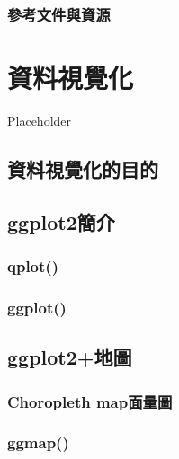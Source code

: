 \documentclass[]{book}
\begin{document}
\hypertarget{ux53c3ux8003ux6587ux4ef6ux8207ux8cc7ux6e90-1}{%
\subsection{參考文件與資源}\label{ux53c3ux8003ux6587ux4ef6ux8207ux8cc7ux6e90-1}}

\hypertarget{vis}{%
\chapter{資料視覺化}\label{vis}}

Placeholder

\hypertarget{ux8cc7ux6599ux8996ux89baux5316ux7684ux76eeux7684}{%
\section{資料視覺化的目的}\label{ux8cc7ux6599ux8996ux89baux5316ux7684ux76eeux7684}}

\hypertarget{ggplot2ux7c21ux4ecb}{%
\section{ggplot2簡介}\label{ggplot2ux7c21ux4ecb}}

\hypertarget{qplot}{%
\subsection{qplot()}\label{qplot}}

\hypertarget{ggplot}{%
\subsection{ggplot()}\label{ggplot}}

\hypertarget{ggplot2ux5730ux5716}{%
\section{ggplot2+地圖}\label{ggplot2ux5730ux5716}}

\hypertarget{choropleth-mapux9762ux91cfux5716}{%
\subsection{Choropleth map面量圖}\label{choropleth-mapux9762ux91cfux5716}}

\hypertarget{ggmap}{%
\subsection{ggmap()}\label{ggmap}}
\end{document}
